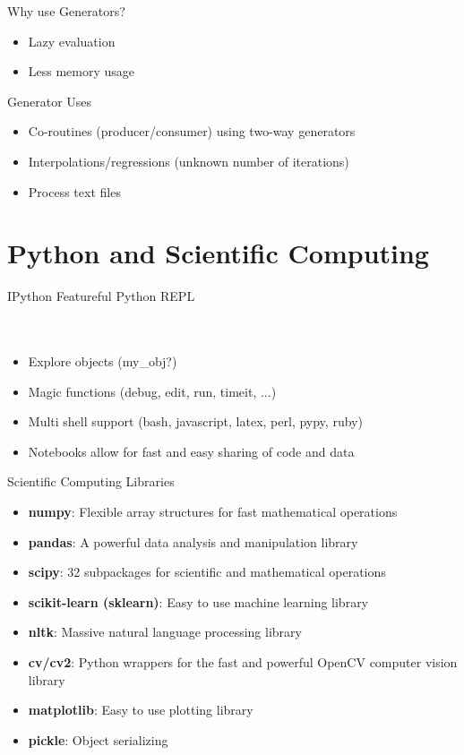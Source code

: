 \documentclass[11pt]{beamer}
\newcommand{\emptyline}{$ $\\}
\begin{document}
		\begin{frame}[fragile]{Why use Generators?}
			\begin{itemize}
				\item Lazy evaluation
				\item Less memory usage
			\end{itemize}
		\end{frame}
		
		\begin{frame}[fragile]{Generator Uses}
			\begin{itemize}
				\item Co-routines (producer/consumer) using two-way generators
				\item Interpolations/regressions (unknown number of iterations)
				\item Process text files
			\end{itemize}
		\end{frame}
		
	\section{Python and Scientific Computing}
		\begin{frame}{IPython}
			Featureful Python REPL
			\emptyline
			\emptyline
			\emptyline
			\pause
			
			\begin{itemize}
				\item Explore objects (my\_obj?)
				\item Magic functions (debug, edit, run, timeit, ...)
				\item Multi shell support (bash, javascript, latex, perl, pypy, ruby)
				\item Notebooks allow for fast and easy sharing of code and data 
			\end{itemize}
		\end{frame}
		
		\begin{frame}{Scientific Computing Libraries}
			\begin{itemize}
				\item \textbf{numpy}: Flexible array structures for fast mathematical operations
				\item \textbf{pandas}: A powerful data analysis and manipulation library
				
				\item \textbf{scipy}: 32 subpackages for scientific and mathematical operations				
				\item \textbf{scikit-learn (sklearn)}: Easy to use machine learning library
				\item \textbf{nltk}: Massive natural language processing library
				\item \textbf{cv/cv2}: Python wrappers for the fast and powerful OpenCV computer vision library
				\item \textbf{matplotlib}: Easy to use plotting library
				\item \textbf{pickle}: Object serializing
			\end{itemize}			 
		\end{frame}
		
\end{document}

